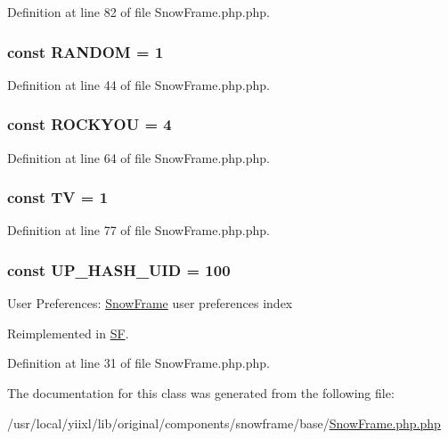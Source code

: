 Definition at line 82 of file SnowFrame.php.php.

\hypertarget{classSnowFrame_a3523601f2c214e9f7884b6bb36b32f71}{
\subsubsection[{RANDOM}]{\setlength{\rightskip}{0pt plus 5cm}const {\bf RANDOM} = 1}}
\label{classSnowFrame_a3523601f2c214e9f7884b6bb36b32f71}


Definition at line 44 of file SnowFrame.php.php.

\hypertarget{classSnowFrame_a4ed35a44107812ce45a57503b872b0ba}{
\subsubsection[{ROCKYOU}]{\setlength{\rightskip}{0pt plus 5cm}const {\bf ROCKYOU} = 4}}
\label{classSnowFrame_a4ed35a44107812ce45a57503b872b0ba}


Definition at line 64 of file SnowFrame.php.php.

\hypertarget{classSnowFrame_a6a68687bdbfddcd5ae897171fa9a2424}{
\subsubsection[{TV}]{\setlength{\rightskip}{0pt plus 5cm}const {\bf TV} = 1}}
\label{classSnowFrame_a6a68687bdbfddcd5ae897171fa9a2424}


Definition at line 77 of file SnowFrame.php.php.

\hypertarget{classSnowFrame_a971fec4a94c055f1e9cfbb6108b186a8}{
\subsubsection[{UP\_\-HASH\_\-UID}]{\setlength{\rightskip}{0pt plus 5cm}const {\bf UP\_\-HASH\_\-UID} = 100}}
\label{classSnowFrame_a971fec4a94c055f1e9cfbb6108b186a8}
User Preferences: \hyperlink{classSnowFrame}{SnowFrame} user preferences index 

Reimplemented in \hyperlink{classSF_a971fec4a94c055f1e9cfbb6108b186a8}{SF}.



Definition at line 31 of file SnowFrame.php.php.



The documentation for this class was generated from the following file:\begin{DoxyCompactItemize}
\item 
/usr/local/yiixl/lib/original/components/snowframe/base/\hyperlink{SnowFrame_8php_8php}{SnowFrame.php.php}\end{DoxyCompactItemize}
